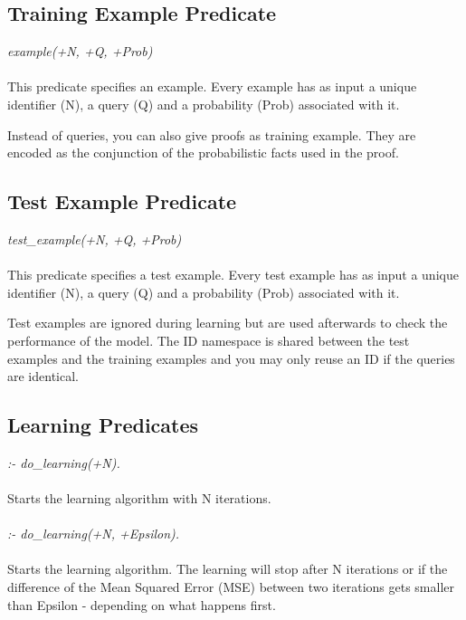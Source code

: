 \documentclass[a4paper,12pt]{article}
\begin{document}
\subsection{Training Example Predicate}
\textit{example(+N, +Q, +Prob)}
\paragraph{}
This predicate specifies an example. Every example has as input a unique identifier (N), a query (Q) and a probability (Prob) associated with it.

Instead of queries, you can also give proofs as training example. They are encoded as the conjunction of the probabilistic facts used in the proof. 

\subsection{Test Example Predicate}
\textit{test\_example(+N, +Q, +Prob)}
\paragraph{}
This predicate specifies a test example. Every test example has as input a unique identifier (N), a query (Q) and a probability (Prob) associated with it.

Test examples are ignored during learning but are used afterwards to check the performance of the model. The ID namespace is shared between the test examples and the training examples and you may only reuse an ID if the queries are identical. 

\subsection{Learning Predicates}
\textit{:- do\_learning(+N).}
\paragraph{}
Starts the learning algorithm with N iterations.
\paragraph{}
\textit{:- do\_learning(+N, +Epsilon).}
\paragraph{}
Starts the learning algorithm. The learning will stop after N iterations or if the difference of the Mean Squared Error (MSE) between two iterations gets smaller than Epsilon - depending on what happens first.
\end{document}
